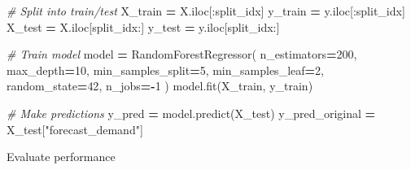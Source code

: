 \documentclass[mstat,12pt]{unswthesis}
\newenvironment{Shaded}{\begin{snugshade}}{\end{snugshade}}
\newcommand{\CommentTok}[1]{\textcolor[rgb]{0.56,0.35,0.01}{\textit{#1}}}
\newcommand{\DecValTok}[1]{\textcolor[rgb]{0.00,0.00,0.81}{#1}}
\newcommand{\NormalTok}[1]{#1}
\newcommand{\OperatorTok}[1]{\textcolor[rgb]{0.81,0.36,0.00}{\textbf{#1}}}
\newcommand{\StringTok}[1]{\textcolor[rgb]{0.31,0.60,0.02}{#1}}
\begin{document}
\begin{Shaded}
\begin{Highlighting}[]
\CommentTok{\# Split into train/test}
\NormalTok{X\_train }\OperatorTok{=}\NormalTok{ X.iloc[:split\_idx]}
\NormalTok{y\_train }\OperatorTok{=}\NormalTok{ y.iloc[:split\_idx]}
\NormalTok{X\_test }\OperatorTok{=}\NormalTok{ X.iloc[split\_idx:]}
\NormalTok{y\_test }\OperatorTok{=}\NormalTok{ y.iloc[split\_idx:]}

\CommentTok{\# Train model}
\NormalTok{model }\OperatorTok{=}\NormalTok{ RandomForestRegressor(}
\NormalTok{    n\_estimators}\OperatorTok{=}\DecValTok{200}\NormalTok{,}
\NormalTok{    max\_depth}\OperatorTok{=}\DecValTok{10}\NormalTok{,}
\NormalTok{    min\_samples\_split}\OperatorTok{=}\DecValTok{5}\NormalTok{,}
\NormalTok{    min\_samples\_leaf}\OperatorTok{=}\DecValTok{2}\NormalTok{,}
\NormalTok{    random\_state}\OperatorTok{=}\DecValTok{42}\NormalTok{,}
\NormalTok{    n\_jobs}\OperatorTok{={-}}\DecValTok{1}
\NormalTok{)}
\NormalTok{model.fit(X\_train, y\_train)}

\CommentTok{\# Make predictions}
\NormalTok{y\_pred }\OperatorTok{=}\NormalTok{ model.predict(X\_test)}
\NormalTok{y\_pred\_original }\OperatorTok{=}\NormalTok{ X\_test[}\StringTok{"forecast\_demand"}\NormalTok{]}
\end{Highlighting}
\end{Shaded}

\noindent Evaluate performance
\end{document}
